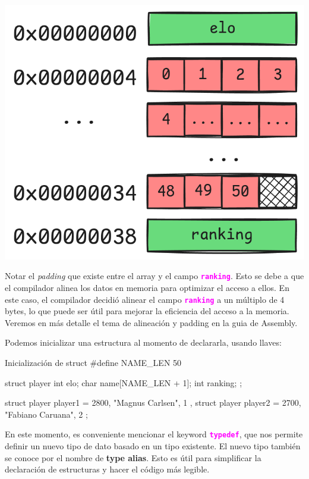 \documentclass[]{scrartcl}
\newcommand{\hl}[1]{\textcolor{magenta}{\textbf{\texttt{#1}}}}
\begin{document}
\begin{center}
  \includegraphics[scale=0.3]{./img/struct.png}  
  \label{fig:struct}
\end{center}

Notar el \textit{padding} que existe entre el array y el campo \hl{ranking}.
Esto se debe a que el compilador alinea los datos en memoria para optimizar el acceso a ellos. En este caso, el compilador decidió alinear el campo \hl{ranking} a un múltiplo de 4 bytes, lo que puede ser útil para mejorar la eficiencia del acceso a la memoria. Veremos en más detalle el tema de alineación y padding en la guia de Assembly. 

Podemos inicializar una estructura al momento de declararla, usando llaves:

\begin{cbox}[]{Inicialización de struct}
#define NAME_LEN 50

struct player{
  int elo;
  char name[NAME_LEN + 1];
  int ranking;
};

struct player player1 = { 2800, "Magnus Carlsen", 1 },
struct player player2 = { 2700, "Fabiano Caruana", 2 };

\end{cbox}

En este momento, es conveniente mencionar el keyword \hl{typedef}, que nos permite definir un nuevo tipo de dato basado en un tipo existente. El nuevo tipo también se conoce por el nombre de \textbf{type alias}. 
Esto es útil para simplificar la declaración de estructuras y hacer el código más legible. 
\end{document}
